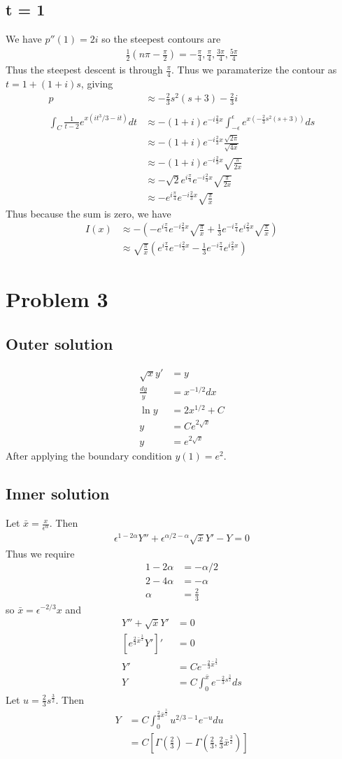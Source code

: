 \documentclass[12pt]{article}
\newcommand{\eq}[1]{\begin{align*}#1\end{align*}}
\begin{document}
\subsection*{t = 1}
We have $p''(1) = 2i$ so the steepest contours are
\eq{
	\frac{1}{2}(n\pi - \frac{\pi}{2}) = -\frac{\pi}{4}, \frac{\pi}{4}, \frac{3\pi}{4}, \frac{5\pi}{4}
}
Thus the steepest descent is through $\frac{\pi}{4}$. Thus we paramaterize the contour as $t = 1 + (1 + i)s$, giving
\eq{
	p &\approx -\frac{2}{3}s^2(s+3) - \frac{2}{3}i\\
	\\
	\int_C \frac{1}{t-2} e^{x(it^3/3 - it)} dt &\approx -(1 + i)e^{-i\frac{2}{3}x}\int_{-\epsilon}^\epsilon e^{x(-\frac{2}{3}s^2(s+3))} ds\\
	&\approx -(1+i)e^{-i\frac{2}{3}x} \frac{\sqrt{2\pi}}{\sqrt{4x}}\\
	&\approx -(1+i)e^{-i\frac{2}{3}x} \sqrt{\frac{\pi}{2x}}\\
	&\approx -\sqrt{2} e^{i\frac{\pi}{4}} e^{-i\frac{2}{3}x} \sqrt{\frac{\pi}{2x}}\\
	&\approx -e^{i\frac{\pi}{4}} e^{-i\frac{2}{3}x} \sqrt{\frac{\pi}{x}}
}
Thus because the sum is zero, we have
\eq{
	I(x) &\approx -(-e^{i\frac{\pi}{4}} e^{-i\frac{2}{3}x} \sqrt{\frac{\pi}{x}} + \frac{1}{3}e^{-i\frac{\pi}{4}} e^{i\frac{2}{3}x} \sqrt{\frac{\pi}{x}})\\
	&\approx \sqrt{\frac{\pi}{x}}(e^{i\frac{\pi}{4}} e^{-i\frac{2}{3}x} - \frac{1}{3}e^{-i\frac{\pi}{4}} e^{i\frac{2}{3}x})
}
\section*{Problem 3}
\subsection*{Outer solution}
\eq{
	\sqrt{x}y' &= y\\
	\frac{dy}{y} &= x^{-1/2}dx\\
	\ln y &= 2x^{1/2} + C\\
	y &= Ce^{2\sqrt{x}}\\
	y &= e^{2\sqrt{x}}
}
After applying the boundary condition $y(1) = e^2$.
\subsection*{Inner solution}
Let $\bar{x} = \frac{x}{\epsilon^\alpha}$. Then
\eq{
	\epsilon^{1-2\alpha} Y'' + \epsilon^{\alpha / 2 - \alpha}\sqrt{\bar{x}} Y' - Y = 0
}
Thus we require
\eq{
	1 - 2\alpha &= -\alpha / 2\\
	2 - 4\alpha &= -\alpha\\
	\alpha &= \frac{2}{3}
}
so $\bar{x} = \epsilon^{-2/3}x$ and
\eq{
	Y'' + \sqrt{\bar{x}}Y' &= 0\\
	\left[e^{\frac{2}{3}\bar{x}^{\frac{3}{2}}} Y'\right]' &= 0\\
	Y' &= Ce^{-\frac{2}{3}\bar{x}^{\frac{3}{2}}}\\
	Y &= C\int_0^{\bar{x}} e^{-\frac{2}{3}s^{\frac{3}{2}}} ds
}
Let $u = \frac{2}{3}s^{\frac{3}{2}}$. Then
\eq{
	Y &= C\int_0^{\frac{2}{3}\bar{x}^{\frac{3}{2}}} u^{2/3 - 1} e^{-u} du\\
	&= C\left[\Gamma(\frac{2}{3}) - \Gamma(\frac{2}{3}, \frac{2}{3}\bar{x}^{\frac{3}{2}})\right]
}
\end{document}
